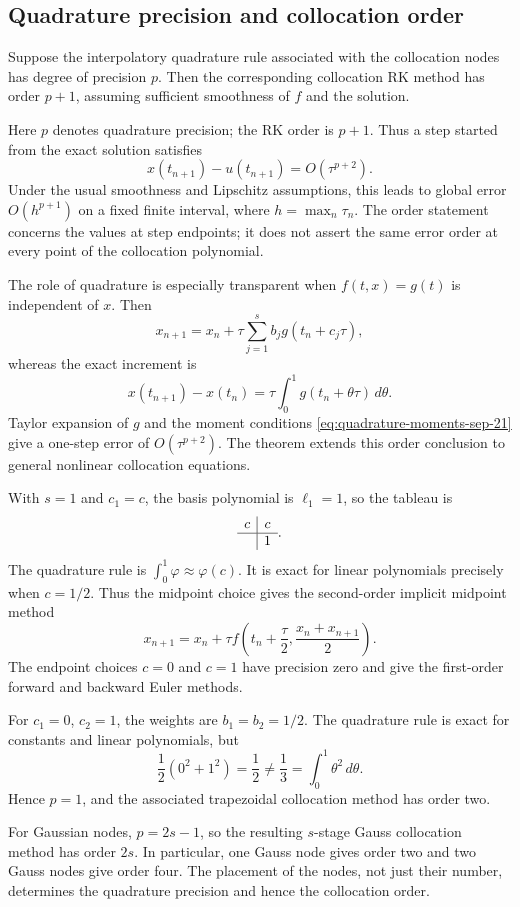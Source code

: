 \subsection{Quadrature precision and collocation order}

\begin{theorem}
 Suppose the interpolatory quadrature rule associated with the
 collocation nodes has degree of precision \(p\). Then the
 corresponding collocation RK method has order \(p+1\), assuming
 sufficient smoothness of \(f\) and the solution.
\end{theorem}

Here \(p\) denotes quadrature precision; the RK order is \(p+1\).
Thus a step started from the exact solution satisfies
\[
 x(t_{n+1})-u(t_{n+1})=O(\tau^{p+2}).
\]
Under the usual smoothness and Lipschitz assumptions, this leads to
global error \(O(h^{p+1})\) on a fixed finite interval, where
\(h=\max_n\tau_n\). The order statement concerns the values at step
endpoints; it does not assert the same error order at every point of
the collocation polynomial.

The role of quadrature is especially transparent when
\(f(t,x)=g(t)\) is independent of \(x\). Then
\[
 x_{n+1}=x_n+\tau\sum_{j=1}^s b_jg(t_n+c_j\tau),
\]
whereas the exact increment is
\[
 x(t_{n+1})-x(t_n)=\tau\int_0^1g(t_n+\theta\tau)\,d\theta.
\]
Taylor expansion of \(g\) and the moment conditions
\eqref{eq:quadrature-moments-sep-21} give a one-step error of
\(O(\tau^{p+2})\). The theorem extends this order conclusion to
general nonlinear collocation equations.

\begin{example}
 With \(s=1\) and \(c_1=c\), the basis polynomial is
 \(\ell_1=1\), so the tableau is
 \[
  \begin{array}{c|c}c&c\\ \hline &1\end{array}.
 \]
 The quadrature rule is \(\int_0^1\varphi\approx\varphi(c)\).
 It is exact for linear polynomials precisely when \(c=1/2\).
 Thus the midpoint choice gives the second-order implicit midpoint
 method
 \[
  x_{n+1}=x_n+\tau f\left(t_n+\frac\tau2,
                              \frac{x_n+x_{n+1}}2\right).
 \]
 The endpoint choices \(c=0\) and \(c=1\) have precision zero
 and give the first-order forward and backward Euler methods.
\end{example}

\begin{example}
 For \(c_1=0\), \(c_2=1\), the weights are
 \(b_1=b_2=1/2\). The quadrature rule is exact for constants and
 linear polynomials, but
 \[
  \frac12(0^2+1^2)=\frac12\neq\frac13=\int_0^1\theta^2\,d\theta.
 \]
 Hence \(p=1\), and the associated trapezoidal collocation method
 has order two.
\end{example}

For Gaussian nodes, \(p=2s-1\), so the resulting \(s\)-stage Gauss
collocation method has order \(2s\). In particular, one Gauss node
gives order two and two Gauss nodes give order four. The placement
of the nodes, not just their number, determines the quadrature
precision and hence the collocation order.
